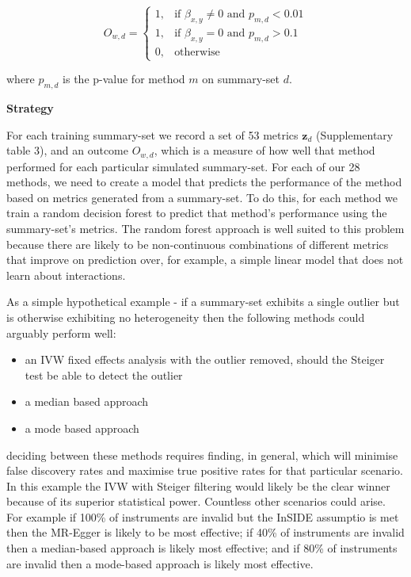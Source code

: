 \documentclass[]{article}
\providecommand{\tightlist}{%
  \setlength{\itemsep}{0pt}\setlength{\parskip}{0pt}}
\begin{document}
\[
    O_{w,d} = 
\begin{cases}
    1,   & \text{if } \beta_{x,y} \neq 0 \text{ and } p_{m,d} < 0.01\\
    1,   & \text{if } \beta_{x,y} = 0 \text{ and } p_{m,d} > 0.1 \\
    0,   & \text{otherwise}
\end{cases}
\]

where \(p_{m,d}\) is the p-value for method \(m\) on summary-set \(d\).

\textbf{Strategy}

For each training summary-set we record a set of 53 metrics
\(\textbf{z}_{d}\) (Supplementary table 3), and an outcome \(O_{w,d}\),
which is a measure of how well that method performed for each particular
simulated summary-set. For each of our 28 methods, we need to create a
model that predicts the performance of the method based on metrics
generated from a summary-set. To do this, for each method we train a
random decision forest to predict that method's performance using the
summary-set's metrics. The random forest approach is well suited to this
problem because there are likely to be non-continuous combinations of
different metrics that improve on prediction over, for example, a simple
linear model that does not learn about interactions.

As a simple hypothetical example - if a summary-set exhibits a single
outlier but is otherwise exhibiting no heterogeneity then the following
methods could arguably perform well:

\begin{itemize}
\tightlist
\item
  an IVW fixed effects analysis with the outlier removed, should the
  Steiger test be able to detect the outlier
\item
  a median based approach
\item
  a mode based approach
\end{itemize}

deciding between these methods requires finding, in general, which will
minimise false discovery rates and maximise true positive rates for that
particular scenario. In this example the IVW with Steiger filtering
would likely be the clear winner because of its superior statistical
power. Countless other scenarios could arise. For example if 100\% of
instruments are invalid but the InSIDE assumptio is met then the
MR-Egger is likely to be most effective; if 40\% of instruments are
invalid then a median-based approach is likely most effective; and if
80\% of instruments are invalid then a mode-based approach is likely
most effective.
\end{document}
